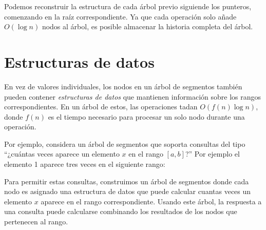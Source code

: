 Podemos reconstruir la estructura de cada árbol previo siguiende los
punteros, comenzando en la raíz correspondiente. Ya que cada operación
solo añade $O(\log n)$ nodos al árbol, es posible almacenar la historia
completa del árbol.

\section{Estructuras de datos}

En vez de valores individuales, los nodos en un árbol de segmentos también
pueden contener \emph{estructuras de datos} que mantienen información sobre
los rangos correspondientes. En un árbol de estos, las operaciones tadan
$O(f(n) \log n)$, donde $f(n)$ es el tiempo necesario para procesar un
solo nodo durante una operación.

Por ejemplo, considera un árbol de segmentos que soporta consultas del tipo
``¿cuántas veces aparece un elemento $x$ en el rango $[a,b]$?'' Por ejemplo
el elemento 1 aparece tres veces en el siguiente rango:

\begin{center}
\end{center}

Para permitir estas consultas, construimos un árbol de segmentos donde
cada nodo es asignado una estructura de datos que puede calcular cuantas
veces un elemento $x$ aparece en el rango correspondiente. Usando este árbol,
la respuesta a una consulta puede calcularse combinando los resultados de
los nodos que pertenecen al rango.

